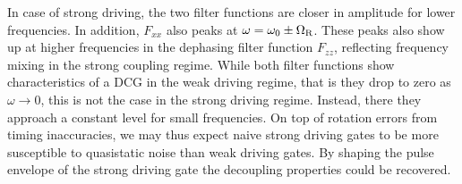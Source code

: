 In case of strong driving, the two filter functions are closer in amplitude for lower frequencies.
In addition, $F_{xx}$ also peaks at $\omega = \omega_0\pm\Omega_{\mathrm{R}}$.
These peaks also show up at higher frequencies in the dephasing filter function $F_{zz}$, reflecting frequency mixing in the strong coupling regime.
While both filter functions show characteristics of a DCG in the weak driving regime, that is they drop to zero as $\omega\rightarrow 0$, this is not the case in the strong driving regime.
Instead, there they approach a constant level for small frequencies.
On top of rotation errors from timing inaccuracies, we may thus expect naive strong driving gates to be more susceptible to quasistatic noise than weak driving gates.
By shaping the pulse envelope of the strong driving gate the decoupling properties could be recovered.

